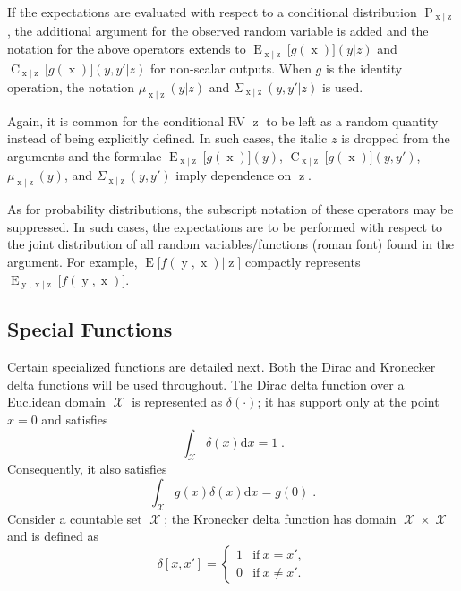 \documentclass[12pt]{article}
\DeclareMathOperator{\xrm}{\mathrm{x}}
\DeclareMathOperator{\yrm}{\mathrm{y}}
\DeclareMathOperator{\zrm}{\mathrm{z}}
\DeclareMathOperator{\Prm}{\mathrm{P}}
\DeclareMathOperator{\Erm}{\mathrm{E}}
\DeclareMathOperator{\Crm}{\mathrm{C}}
\DeclareMathOperator{\Xcal}{\mathcal{X}}
\begin{document}
If the expectations are evaluated with respect to a conditional distribution $\Prm_{\xrm | \zrm}$, the additional argument for the observed random variable is added and the notation for the above operators extends to $\Erm_{\xrm|\zrm}\big[ g(\xrm) \big](y|z)$ and $\Crm_{\xrm|\zrm}\big[g(\xrm)\big](y,y'|z)$ for non-scalar outputs. When $g$ is the identity operation, the notation $\mu_{\xrm|\zrm}(y|z)$ and $\Sigma_{\xrm|\zrm}(y,y'|z)$ is used.

Again, it is common for the conditional RV $\zrm$ to be left as a random quantity instead of being explicitly defined. In such cases, the italic $z$ is dropped from the arguments and the formulae $\Erm_{\xrm|\zrm}\big[ g(\xrm) \big](y)$, $\Crm_{\xrm|\zrm}\big[g(\xrm)\big](y,y')$, $\mu_{\xrm|\zrm}(y)$, and $\Sigma_{\xrm|\zrm}(y,y')$ imply dependence on $\zrm$.

As for probability distributions, the subscript notation of these operators may be suppressed. In such cases, the expectations are to be performed with respect to the joint distribution of all random variables/functions (roman font) found in the argument. For example, $\Erm\big[f(\yrm,\xrm) | \zrm \big]$ compactly represents $\Erm_{\yrm,\xrm | \zrm}\big[f(\yrm,\xrm)\big]$.


\subsection*{Special Functions}

Certain specialized functions are detailed next. Both the Dirac and Kronecker delta functions will be used throughout. The Dirac delta function over a Euclidean domain $\Xcal$ is represented as $\delta(\cdot)$; it has support only at the point $x=0$ and satisfies
\begin{equation}
\int_{\Xcal} \delta(x) \mathrm{d}x = 1 \;.
\end{equation}
Consequently, it also satisfies
\begin{equation}
\int_{\Xcal} g(x) \delta(x) \mathrm{d}x = g(0) \;.
\end{equation}
Consider a countable set $\Xcal$; the Kronecker delta function has domain $\Xcal \times \Xcal$ and is defined as
\begin{equation}
\delta[x,x'] = \begin{cases} 1 & \mathrm{if} \ x = x', \\ 0 & \mathrm{if} \ x \neq x'.  \end{cases}
\end{equation}
\end{document}
